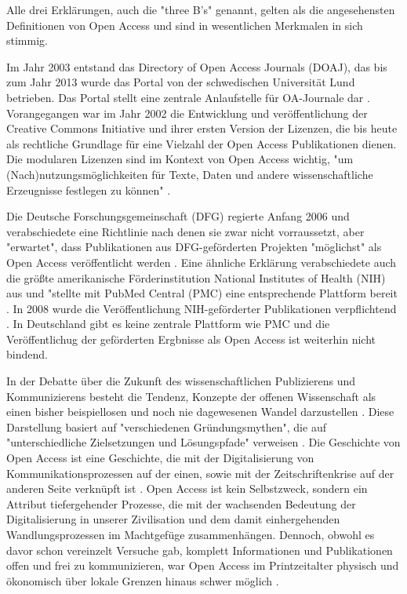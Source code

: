 Alle drei Erklärungen, auch die "three B's"\cite{suber_2004_praising_oa} genannt, gelten als die angesehensten Definitionen von Open Access und sind in wesentlichen Merkmalen in sich stimmig\cite{albert_2006_open_implications}.

Im Jahr 2003 entstand das Directory of Open Access Journals (DOAJ), das bis zum Jahr 2013 wurde das Portal von der schwedischen Universität Lund betrieben. Das Portal stellt eine zentrale Anlaufstelle für OA-Journale dar \cite{suchen-Hoffmann-Zugang-undVerwertung-öffentlicher-Informationen}. Vorangegangen war im Jahr 2002 die Entwicklung und veröffentlichung der Creative Commons Initiative \cite{suchen-Hoffmann-Zugang-undVerwertung-öffentlicher-Informationen} und ihrer ersten Version der Lizenzen, die bis heute als rechtliche Grundlage für eine Vielzahl der Open Access Publikationen dienen\cite{suchen}. Die modularen Lizenzen sind im Kontext von Open Access wichtig, "um (Nach)nutzungsmöglichkeiten für Texte, Daten und andere wissenschaftliche Erzeugnisse festlegen zu können" \cite{suchen-Hoffmann-Zugang-undVerwertung-öffentlicher-Informationen}.

Die Deutsche Forschungsgemeinschaft (DFG) regierte Anfang 2006 und verabschiedete eine Richtlinie nach denen sie zwar nicht vorraussetzt, aber "erwartet", dass Publikationen aus DFG-geförderten Projekten "möglichst" als Open Access veröffentlicht werden \cite{suchen:dfg-richtlinie}. Eine ähnliche Erklärung verabschiedete auch die größte amerikanische Förderinstitution National Institutes of Health (NIH) aus und "stellte mit PubMed Central (PMC) eine entsprechende Plattform bereit \cite{muller_2010_open}. In 2008 wurde die Veröffentlichung NIH-geförderter Publikationen verpflichtend \cite{Hanekop_2014}. In Deutschland gibt es keine zentrale Plattform wie PMC und die Veröffentlichug der geförderten Ergbnisse als Open Access ist weiterhin nicht bindend.

In der Debatte über die Zukunft des wissenschaftlichen Publizierens und Kommunizierens besteht die Tendenz, Konzepte der offenen Wissenschaft als einen bisher beispiellosen und noch nie dagewesenen Wandel darzustellen \cite{cite:17a} \cite{cite:17b}. Diese Darstellung basiert auf "verschiedenen Gründungsmythen", die auf "unterschiedliche Zielsetzungen und Lösungspfade" verweisen \cite{suchen-Hoffmann-Zugang-undVerwertung-öffentlicher-Informationen}. Die Geschichte von Open Access ist eine Geschichte, die mit der Digitalisierung von Kommunikationsprozessen \cite{albert_2006_open_implications} auf der einen, sowie mit der Zeitschriftenkrise auf der anderen Seite verknüpft ist \cite{suchen-Hoffmann-Zugang-undVerwertung-öffentlicher-Informationen}. Open Access ist kein Selbstzweck\cite{cite:17d}, sondern ein Attribut tiefergehender Prozesse, die mit der wachsenden Bedeutung der Digitalisierung in unserer Zivilisation und dem damit einhergehenden Wandlungsprozessen im Machtgefüge zusammenhängen\cite{cite:17e}. Dennoch, obwohl es davor schon vereinzelt Versuche gab, komplett Informationen und Publikationen offen und frei zu kommunizieren, war Open Access im Printzeitalter physisch und ökonomisch über lokale Grenzen hinaus schwer möglich \cite{cite:18a}.

